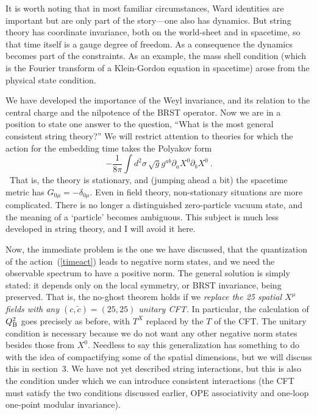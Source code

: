 It is worth noting that in most familiar
circumstances, Ward identities are important but are only part of
the story---one also has dynamics.  But string theory has coordinate
invariance, both on the world-sheet and in spacetime, so that time
itself is a gauge degree of freedom.  As a consequence the dynamics
becomes part of the constraints.  As an example, the mass shell
condition (which is the Fourier transform of a Klein-Gordon equation
in spacetime) arose from the physical state condition.


We have developed the importance of the Weyl invariance,
and its relation to the central charge and the nilpotence of the BRST
operator.  Now we are in a position to
state one answer to the question, ``What is the most general
consistent string theory?''  We will restrict attention to
theories for which the action for the embedding
time takes the Polyakov form
\begin{equation}
- \frac{1}{8\pi} \int d^2 \sigma \,\sqrt{g}
g^{ab} \partial_a X^0 \partial_b X^0\ . \label{timeact}
\end{equation} \
That is, the theory is stationary, and (jumping ahead a bit) the
spacetime metric has $G_{0\mu} = -\delta_{0\mu}$.
Even in field theory, non-stationary situations are more
complicated.  There is no longer a distinguished zero-particle
vacuum state,
and the meaning of a `particle' becomes
ambiguous. This subject is much less developed in string theory, and
I will avoid it here.

Now, the immediate problem is the one we have discussed, that the
quantization of the action~(\ref{timeact}) leads to negative
norm states, and we need the observable spectrum to have a
positive norm.  The general solution is simply stated: it
depends only on the local symmetry, or BRST invariance, being
preserved.  That is, the no-ghost theorem holds if we
{\it replace the 25 spatial $X^\mu$ fields with any $(c, \tilde
c) = (25,25)$ unitary CFT.}  In particular, the calculation of 
$Q_{\rm B}^2$ goes precisely as before, with $T^X$ replaced by the
$T$ of the CFT.  The unitary condition is necessary
because we do not want any other negative norm states besides
those from $X^0$.
Needless to say this generalization has something to do with the idea
of compactifying some of the spatial dimensions, but we will discuss
this in section~3.  We have not yet described string
interactions, but this is also the condition under which we
can introduce consistent interactions (the CFT
must satisfy the two conditions discussed earlier, OPE associativity
and one-loop one-point modular invariance).

